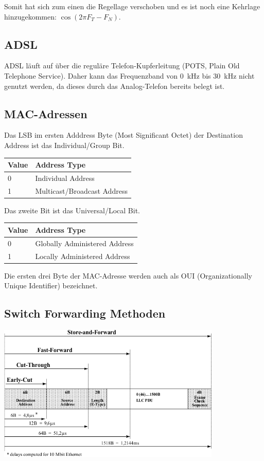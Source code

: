 Somit hat sich zum einen die Regellage verschoben und es ist noch eine Kehrlage
hinzugekommen: $\cos (2\pi F_T - F_N)$.


\subsection{ADSL}

ADSL läuft auf über die reguläre Telefon-Kupferleitung (POTS, Plain Old
Telephone Service). Daher kann das Frequenzband von 0~kHz bis 30~kHz nicht
genutzt werden, da dieses durch das Analog-Telefon bereits belegt ist.


\subsection{MAC-Adressen}

Das LSB im ersten Adddress Byte (Most Significant Octet) der Destination Address
ist das Individual/Group Bit.

\begin{tabular}[h]{|l|l|}
	\hline
  \textbf{Value} & \textbf{Address Type} \\
	\hline
  0 & Individual Address \\
  1 & Multicast/Broadcast Address \\
	\hline
\end{tabular}

Das zweite Bit ist das Universal/Local Bit.

\begin{tabular}[h]{|l|l|}
	\hline
  \textbf{Value} & \textbf{Address Type} \\
	\hline
  0 & Globally Administered Address \\
  1 & Locally Administered Address \\
	\hline
\end{tabular}

Die ersten drei Byte der MAC-Adresse werden auch als OUI (Organizationally
Unique Identifier) bezeichnet.


\subsection{Switch Forwarding Methoden}

\begin{center}
	\includegraphics[width=0.8\textwidth]{media/switch_forwarding.png}
\end{center}

